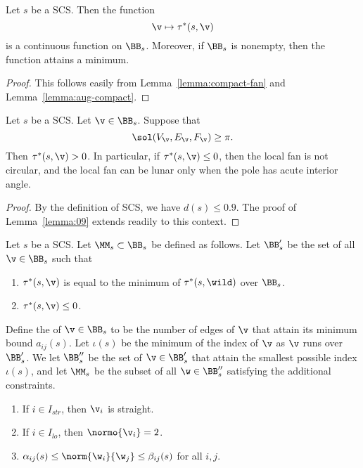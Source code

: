 \begin{lemma}[continuity]\label{lemma:hdpv2}
Let $s$ be a SCS.  Then the function 
\[
\v\mapsto \tau^*(s,\v)
\]
is a continuous function on $\BB_s$.  Moreover, if $\BB_s$ is
nonempty, then the function attains a minimum.
\end{lemma}

\begin{proof} This follows easily from Lemma~\ref{lemma:compact-fan} and
Lemma~\ref{lemma:aug-compact}.
\end{proof}

\begin{lemma}\label{lemma:not-circular}
Let $s$ be a SCS.  Let $\v\in \BB_s$.
Suppose that
\[
\sol(V_\v,E_\v,F_\v) \ge \pi.
\]
Then $\tau^*(s,\v)>0$.
In particular, if 
$\tau^*(s,\v)\le0$, then the local fan is not circular, and
the local fan can be lunar only when the pole has acute interior
angle.
\end{lemma}

\begin{proof} By the definition of SCS,
we have $d(s)\le 0.9$. The proof of Lemma~\ref{lemma:09} extends readily
to this context.
\end{proof}


\begin{definition}
Let $s$ be a SCS.
Let $\MM_{s}\subset \BB_{s}$ be defined as follows.
Let $\BB'_{s}$ be the set of all $\v\in \BB_{s}$ such that
\begin{enumerate}
\item $\tau^*(s,\v)$ is equal to the minimum of $\tau^*(s,\wild)$ over $\BB_{s}$.
\item $\tau^*(s,\v)\le 0$.
\end{enumerate}
Define the  of $\v\in \BB_s$ to be the number of edges of $\v$
that attain its minimum bound $a_{i j}(s)$.  Let $\iota(s)$ be the minimum
of the index of $\v$ as $\v$ runs over $\BB'_s$.  
We let $\BB''_{s}$  be the set of $\v\in \BB'_{s}$ that attain
the smallest possible index $\iota(s)$,
and let $\MM_s$ be the subset of all $\w\in\BB''_s$ satisfying the additional
constraints.
\begin{enumerate}
\item If $i\in I_{str}$,  then $\v_i$ is straight.
\item If $i\in I_{lo}$,  then $\normo{\v_i}=2$.
\item $\alpha_{ij}(s)\le \norm{\w_i}{\w_j}\le \beta_{ij}(s)$ for all $i,j$.
\end{enumerate}
\end{definition}


